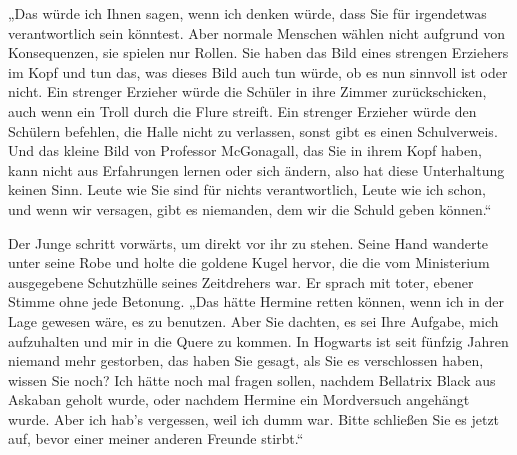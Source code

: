 „Das würde ich Ihnen sagen, wenn ich denken würde, dass Sie für irgendetwas verantwortlich sein könntest. Aber normale Menschen wählen nicht aufgrund von Konsequenzen, sie spielen nur Rollen. Sie haben das Bild eines strengen Erziehers im Kopf und tun das, was dieses Bild auch tun würde, ob es nun sinnvoll ist oder nicht. Ein strenger Erzieher würde die Schüler in ihre Zimmer zurückschicken, auch wenn ein Troll durch die Flure streift. Ein strenger Erzieher würde den Schülern befehlen, die Halle nicht zu verlassen, sonst gibt es einen Schulverweis. Und das kleine Bild von Professor McGonagall, das Sie in ihrem Kopf haben, kann nicht aus Erfahrungen lernen oder sich ändern, also hat diese Unterhaltung keinen Sinn. Leute wie Sie sind für nichts verantwortlich, Leute wie ich schon, und wenn wir versagen, gibt es niemanden, dem wir die Schuld geben können.“

Der Junge schritt vorwärts, um direkt vor ihr zu stehen. Seine Hand wanderte unter seine Robe und holte die goldene Kugel hervor, die die vom Ministerium ausgegebene Schutzhülle seines Zeitdrehers war. Er sprach mit toter, ebener Stimme ohne jede Betonung.
„Das hätte Hermine retten können, wenn ich in der Lage gewesen wäre, es zu benutzen. Aber Sie dachten, es sei Ihre Aufgabe, mich aufzuhalten und mir in die Quere zu kommen. In Hogwarts ist seit fünfzig Jahren niemand mehr gestorben, das haben Sie gesagt, als Sie es verschlossen haben, wissen Sie noch? Ich hätte noch mal fragen sollen, nachdem Bellatrix Black aus Askaban geholt wurde, oder nachdem Hermine ein Mordversuch angehängt wurde. Aber ich hab’s vergessen, weil ich dumm war. Bitte schließen Sie es jetzt auf, bevor einer meiner anderen Freunde stirbt.“

